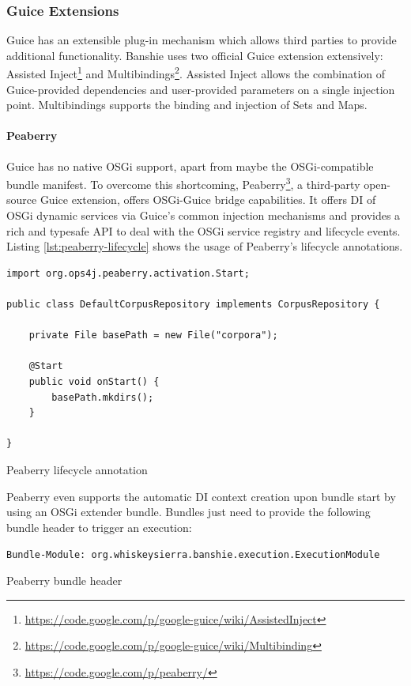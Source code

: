 \subsubsection{Guice Extensions}
Guice has an extensible plug-in mechanism which allows third parties to provide additional functionality. Banshie uses two official Guice extension extensively: Assisted Inject\footnote{\url{https://code.google.com/p/google-guice/wiki/AssistedInject}} and Multibindings\footnote{\url{https://code.google.com/p/google-guice/wiki/Multibinding}}. Assisted Inject allows the combination of Guice-provided dependencies and user-provided parameters on a single injection point. Multibindings supports the binding and injection of Sets and Maps.

\paragraph{Peaberry}
Guice has no native OSGi support, apart from maybe the OSGi-compatible bundle manifest. To overcome this shortcoming, Peaberry\footnote{\url{https://code.google.com/p/peaberry/}}, a third-party open-source Guice extension, offers OSGi-Guice bridge capabilities. It offers \gls{DI} of OSGi dynamic services via Guice's common injection mechanisms and provides a rich and typesafe API to deal with the OSGi service registry and lifecycle events. Listing \ref{lst:peaberry-lifecycle} shows the usage of Peaberry's lifecycle annotations.

\begin{listing}[H]
\begin{verbatim}
import org.ops4j.peaberry.activation.Start;

public class DefaultCorpusRepository implements CorpusRepository {

    private File basePath = new File("corpora");

    @Start
    public void onStart() {
        basePath.mkdirs();
    }

}
\end{verbatim}
\caption{Peaberry lifecycle annotation}
\label{lst:peaberry-lifecycle}
\end{listing}

Peaberry even supports the automatic \gls{DI} context creation upon bundle start by using an OSGi extender bundle. Bundles just need to provide the following bundle header to trigger an execution:

\begin{listing}[H]
\texttt{Bundle-Module: org.whiskeysierra.banshie.execution.ExecutionModule}
\caption{Peaberry bundle header}
\end{listing}

